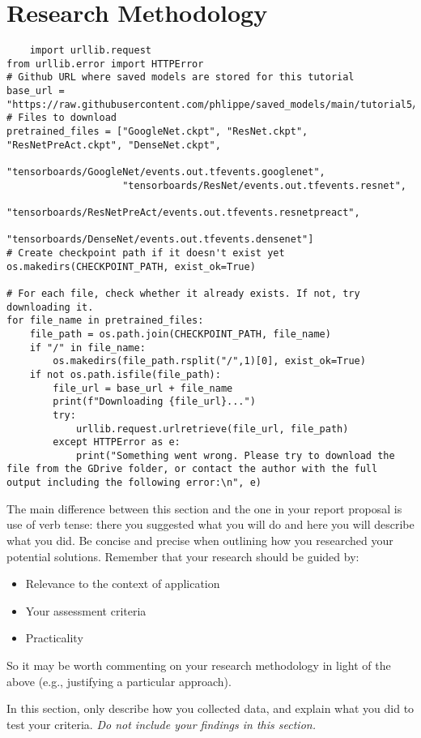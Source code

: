 \documentclass[peerreview]{IEEEtran}
\begin{document}
\section{Research Methodology}
\begin{lstlisting}
    import urllib.request
from urllib.error import HTTPError
# Github URL where saved models are stored for this tutorial
base_url = "https://raw.githubusercontent.com/phlippe/saved_models/main/tutorial5/"
# Files to download
pretrained_files = ["GoogleNet.ckpt", "ResNet.ckpt", "ResNetPreAct.ckpt", "DenseNet.ckpt",
                    "tensorboards/GoogleNet/events.out.tfevents.googlenet",
                    "tensorboards/ResNet/events.out.tfevents.resnet",
                    "tensorboards/ResNetPreAct/events.out.tfevents.resnetpreact",
                    "tensorboards/DenseNet/events.out.tfevents.densenet"]
# Create checkpoint path if it doesn't exist yet
os.makedirs(CHECKPOINT_PATH, exist_ok=True)

# For each file, check whether it already exists. If not, try downloading it.
for file_name in pretrained_files:
    file_path = os.path.join(CHECKPOINT_PATH, file_name)
    if "/" in file_name:
        os.makedirs(file_path.rsplit("/",1)[0], exist_ok=True)
    if not os.path.isfile(file_path):
        file_url = base_url + file_name
        print(f"Downloading {file_url}...")
        try:
            urllib.request.urlretrieve(file_url, file_path)
        except HTTPError as e:
            print("Something went wrong. Please try to download the file from the GDrive folder, or contact the author with the full output including the following error:\n", e)
\end{lstlisting}
The main difference between this section and the one in your report proposal is use of verb tense: there you suggested what you will do and here you will describe what you did. Be concise and precise when outlining how you researched your potential solutions.
Remember that your research should be guided by:
\begin{itemize}
\item Relevance to the context of application
\item Your assessment criteria
\item Practicality
\end{itemize}
So it may be worth commenting on your research methodology in light of the above (e.g., justifying a particular approach).

In this section, only describe how you collected data, and explain what you did to test your criteria.  \emph{Do not include your findings in this section.}
\end{document}
